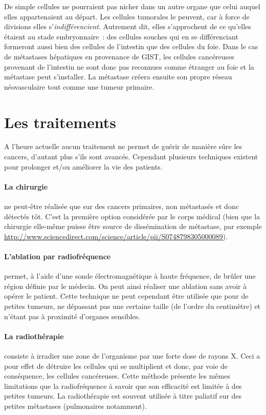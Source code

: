 \documentclass[main.tex]{subfiles}
\begin{document}
De simple cellules ne pourraient pas nicher dans un autre organe que celui auquel elles appartenaient au départ. Les cellules tumorales le peuvent, car à force de divisions elles s'\emph{indifférencient}. Autrement dit, elles s'approchent de ce qu'elles étaient au stade embryonnaire~: des cellules souches qui en se différenciant formeront aussi bien des cellules de l'intestin que des cellules du foie. Dans le cas de métastases hépatiques en provenance de GIST, les cellules cancéreuses provenant de l'intestin ne sont donc pas reconnues comme étranger au foie et la métastase peut s'installer. La métastase créera ensuite son propre réseau néovasculaire tout comme une tumeur primaire.

\section{Les traitements}
A l'heure actuelle aucun traitement ne permet de guérir de manière sûre les cancers, d'autant plus s'ils sont avancés.  Cependant plusieurs techniques existent pour prolonger et/ou améliorer la vie des patients.
\paragraph{La chirurgie} ne peut-être réalisée que sur des cancers primaires, non métastasés et donc détectés tôt. C'est la première option considérée par le corps médical (bien que la chirurgie elle-même puisse être source de dissémination de métastase, \cf par exemple  \url{http://www.sciencedirect.com/science/article/pii/S0748798305000089}).

\paragraph{L'ablation par radiofréquence} permet, à l'aide d'une sonde électromagnétique à haute fréquence, de brûler une région définie par le médecin. On peut ainsi réaliser une ablation sans avoir à opérer le patient. Cette technique  
ne peut cependant être utilisée que pour de petites tumeurs, ne dépassant pas une certaine taille (de l'ordre du centimètre) et n'étant pas à proximité d'organes sensibles. 

\paragraph{La radiothérapie} consiste à irradier une zone de l'organisme par une forte dose de rayons X. Ceci a pour effet de détruire les cellules qui se multiplient  et donc, par voie de conséquence, les cellules cancéreuses. Cette méthode présente les mêmes limitations que la radiofréquence à savoir que son efficacité est limitée à des petites tumeurs. La radiothérapie est souvent utilisée à titre paliatif sur des petites métastases (pulmonaires notamment).
\end{document}
